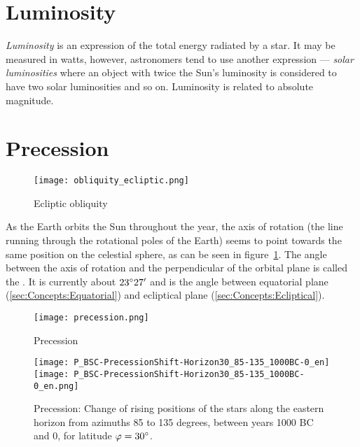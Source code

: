 \section{Luminosity}
\label{sec:Concepts:Luminosity}

\emph{Luminosity} is an expression of the total energy radiated by a
star. It may be measured in watts, however, astronomers tend to use
another expression --- \emph{solar luminosities} where an object with
twice the Sun's luminosity is considered to have two solar luminosities
and so on. Luminosity is related to absolute magnitude.

\section{Precession}
\label{sec:Concepts:Precession}

\begin{figure}[htb]
\centering\texttt{[image: obliquity\_ecliptic.png]}
\caption{Ecliptic obliquity}
\label{fig:Obliquity}
\end{figure}

As the Earth orbits the Sun throughout the year, the axis of rotation
(the line running through the rotational poles of the Earth) seems to
point towards the same position on the celestial sphere, as can be
seen in figure~\ref{fig:Obliquity}. The angle between the axis of
rotation and the perpendicular of the orbital plane is called the
. It is currently about
$23\degree27'$ and is the angle between equatorial plane
(\ref{sec:Concepts:Equatorial}) and ecliptical plane
(\ref{sec:Concepts:Ecliptical}).

\begin{figure}[p]
\centering\texttt{[image: precession.png]}
\caption{Precession}
\label{fig:Precession}
\end{figure}

\begin{figure}[p]
\centering
\ifpdf
\texttt{[image: P\_BSC-PrecessionShift-Horizon30\_85-135\_1000BC-0\_en]}
\else
\texttt{[image: P\_BSC-PrecessionShift-Horizon30\_85-135\_1000BC-0\_en.png]}
\fi
\caption{Precession: Change of rising positions of the stars along the
  eastern horizon from azimuths 85 to 135 degrees, between years 1000
  BC and 0, for latitude $\varphi=30\degree$.}
\label{fig:Precession:AzimuthShift}
\end{figure}




